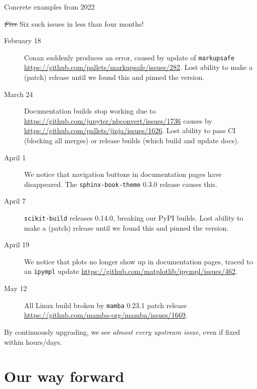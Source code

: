 \documentclass[english,aspectratio=1610,smaller]{beamer}
\begin{document}
\begin{frame}[fragile]{Concrete examples from 2022}
  \vspace{-2mm}
  \begin{block}{\sout{\emph{Five}} Six such issues in less than four months!}
    \begin{description}
      \item[February 18] Conan suddenly produces an error, caused by update of \texttt{markupsafe} \url{https://github.com/pallets/markupsafe/issues/282}.
        Lost ability to make a (patch) release until we found this and pinned the version.
      \item[March 24] Documentation builds stop working due to \url{https://github.com/jupyter/nbconvert/issues/1736} causes by \url{https://github.com/pallets/jinja/issues/1626}.
        Lost ability to pass CI (blocking all merges) or release builds (which build and update docs).
      \item[April 1] We notice that navigation buttons in documentation pages have disappeared. The \texttt{sphinx-book-theme} 0.3.0 release causes this.
      \item[April 7] \texttt{scikit-build} releases 0.14.0, breaking our PyPI builds.
        Lost ability to make a (patch) release until we found this and pinned the version.
      \item[April 19] We notice that plots no longer show up in documentation pages, traced to an \texttt{ipympl} update \url{https://github.com/matplotlib/ipympl/issues/462}.
      \item[May 12] All Linux build broken by \texttt{mamba} 0.23.1 patch release \url{https://github.com/mamba-org/mamba/issues/1669}.
    \end{description}
  \end{block}
  By continuously upgrading, we see \emph{almost every upstream issue}, even if fixed within hours/days.
\end{frame}

\section{Our way forward}
\end{document}
